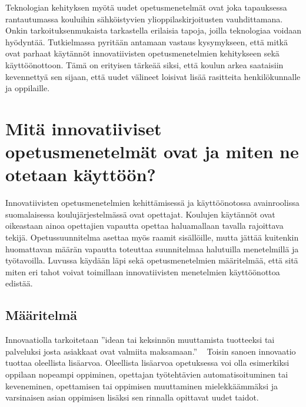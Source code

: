 \documentclass[utf8,bachelor]{gradu3}
\begin{document}
Teknologian kehityksen myötä uudet opetusmenetelmät ovat joka tapauksessa rantautumassa kouluihin sähköistyvien ylioppilaskirjoitusten vauhdittamana. Onkin tarkoituksenmukaista tarkastella erilaisia tapoja, joilla teknologiaa voidaan hyödyntää. Tutkielmassa pyritään antamaan vastaus kysymykseen, että mitkä ovat parhaat käytännöt innovatiivisten opetusmenetelmien kehitykseen sekä käyttöönottoon. Tämä on erityisen tärkeää siksi, että koulun arkea saataisiin kevennettyä sen sijaan, että uudet välineet loisivat lisää rasitteita henkilökunnalle ja oppilaille.





\chapter{Mitä innovatiiviset opetusmenetelmät ovat ja miten ne otetaan käyttöön?} %
Innovatiivisten opetusmenetelmien kehittämisessä ja käyttöönotossa avainroolissa suomalaisessa koulujärjestelmässä ovat opettajat. Koulujen käytännöt ovat oikeastaan ainoa opettajien vapautta opettaa haluamallaan tavalla rajoittava tekijä. Opetussuunnitelma asettaa myös raamit sisällöille, mutta jättää kuitenkin huomattavan määrän vapautta toteuttaa suunnitelmaa halutuilla menetelmillä ja työtavoilla. Luvussa käydään läpi sekä opetusmenetelmien määritelmää, että sitä miten eri tahot voivat toimillaan innovatiivisten menetelmien käyttöönottoa edistää.


\section{Määritelmä}
Innovaatiolla tarkoitetaan ''idean tai keksinnön muuttamista tuotteeksi tai palveluksi josta asiakkaat ovat valmiita maksamaan.'' ~\parencite[][]{innovaatio} Toisin sanoen innovaatio tuottaa oleellista lisäarvoa. Oleellista lisäarvoa opetuksessa voi olla esimerkiksi oppilaan nopeampi oppiminen, opettajan työtehtävien automatisoituminen tai keveneminen, opettamisen tai oppimisen muuttaminen mielekkäämmäksi ja varsinaisen asian oppimisen lisäksi sen rinnalla opittavat uudet taidot.
\end{document}
